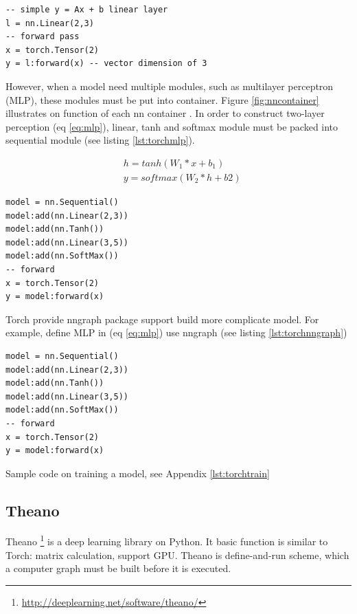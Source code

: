 \begin{lstlisting}[caption={Simple linear layer in Torch},label={lst:torchlinear}, language={[5.1]Lua}]
-- simple y = Ax + b linear layer
l = nn.Linear(2,3)
-- forward pass
x = torch.Tensor(2)
y = l:forward(x) -- vector dimension of 3
\end{lstlisting}

However, when a model need multiple modules, such as multilayer perceptron (MLP), these modules must be put into container. Figure \ref{fig:nncontainer} illustrates on function of each nn container . In order to construct two-layer perception (eq \ref{eq:mlp}), linear, tanh and softmax module must be packed into sequential module (see listing \ref{lst:torchmlp}).

\begin{equation}
\label{eq:mlp}
\begin{aligned}
&h = tanh(W_1*x + b_1) \\
&y = softmax(W_2*h + b2)
\end{aligned}
\end{equation}


\begin{lstlisting}[caption={MLP in Torch},label={lst:torchmlp}, language={[5.1]Lua}]
model = nn.Sequential()
model:add(nn.Linear(2,3))
model:add(nn.Tanh())
model:add(nn.Linear(3,5))
model:add(nn.SoftMax())
-- forward
x = torch.Tensor(2)
y = model:forward(x)
\end{lstlisting}

Torch provide nngraph package support build more complicate model. For example, define MLP in (eq \ref{eq:mlp}) use nngraph (see listing \ref{lst:torchnngraph})

\begin{lstlisting}[caption={MLP using nngraph},label={lst:torchnngraph}, language={[5.1]Lua}]
model = nn.Sequential()
model:add(nn.Linear(2,3))
model:add(nn.Tanh())
model:add(nn.Linear(3,5))
model:add(nn.SoftMax())
-- forward
x = torch.Tensor(2)
y = model:forward(x)
\end{lstlisting}

Sample code on training a model, see Appendix \ref{lst:torchtrain}

\subsection{Theano}
Theano \footnote{\url{http://deeplearning.net/software/theano/}} is a deep learning library on Python. It basic function is similar to Torch: matrix calculation, support GPU. Theano is define-and-run scheme, which a computer graph must be built before it is executed.

